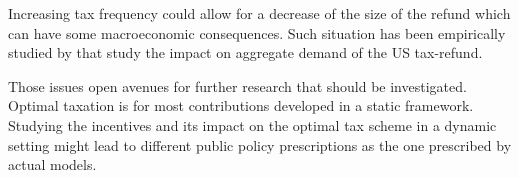Increasing tax frequency could allow for a decrease of the size of the refund
which can have some macroeconomic consequences. Such situation has been
empirically studied by
\citet{shapiro1993consumer,shapiro2003consumer,shapiro2009did} that study the
impact on aggregate demand of the US tax-refund.

Those issues open avenues for further research that should be investigated.
Optimal taxation is for most contributions developed in a static framework.
Studying the incentives and its impact on the optimal tax scheme in a dynamic
setting might lead to different public policy prescriptions as the one
prescribed by actual models.

\newpage





\ifx\isEmbedded\undefined
\newpage
%

\else \fi